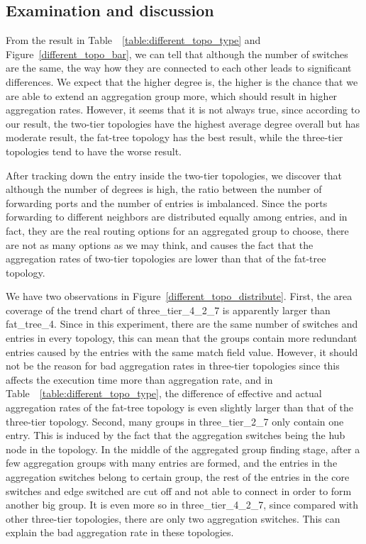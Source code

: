 \subsection{Examination and discussion}
\label{examination_and_discussion}
From the result in Table~~\ref{table:different_topo_type} and Figure~\ref{different_topo_bar}, we can tell that although the number of switches are the same, the way how they are connected to each other leads to significant differences. We expect that the higher degree is, the higher is the chance that we are able to extend an aggregation group more, which should result in higher aggregation rates. However, it seems that it is not always true, since according to our result, the two-tier topologies have the highest average degree overall but has moderate result, the fat-tree topology has the best result, while the three-tier topologies tend to have the worse result. 

After tracking down the entry inside the two-tier topologies, we discover that although the number of degrees is high, the ratio between the number of forwarding ports and the number of entries is imbalanced. Since the ports forwarding to different neighbors are distributed equally among entries, and in fact, they are the real routing options for an aggregated group to choose, there are not as many options as we may think, and  causes the fact that the aggregation rates of two-tier topologies are lower than that of the fat-tree topology. 

We have two observations in Figure~\ref{different_topo_distribute}. First, the area coverage of the trend chart of three\_tier\_4\_2\_7 is apparently larger than fat\_tree\_4. Since in this experiment, there are the same number of switches and entries in every topology, this can mean that the groups contain more redundant entries caused by the entries with the same match field value. However, it should not be the reason for bad aggregation rates in three-tier topologies since this affects the execution time more than aggregation rate, and in Table~~\ref{table:different_topo_type}, the difference of effective and actual aggregation rates of the fat-tree topology is even slightly larger than that of the three-tier topology. Second, many groups in three\_tier\_2\_7 only contain one entry. This is induced by the fact that the aggregation switches being the hub node in the topology. In the middle of the aggregated group finding stage, after a few aggregation groups with many entries are formed, and the entries in the aggregation switches belong to certain group, the rest of the entries in the core switches and edge switched are cut off and not able to connect in order to form another big group. It is even more so in three\_tier\_4\_2\_7, since compared with other three-tier topologies, there are only two aggregation switches. This can explain the bad aggregation rate in these topologies.


